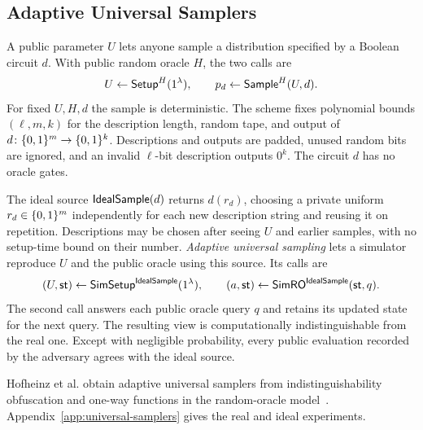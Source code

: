 \subsection{Adaptive Universal Samplers}
\label{sec:universal-samplers}
\label{sec:universal-sampler-syntax}

A public parameter $U$ lets anyone sample a distribution specified by a
Boolean circuit $d$.  With public random oracle $H$, the two calls are
\[
  U\mathrel{\leftarrow}\mathsf{Setup}^H(1^\lambda),
  \qquad p_d\gets\mathsf{Sample}^H(U,d).
\]
For fixed $U,H,d$ the sample is deterministic.  The scheme fixes polynomial
bounds $(\ell,m,k)$ for the description length, random tape, and output of
$d\colon\{0,1\}^m\to\{0,1\}^k$.  Descriptions and outputs are padded, unused
random bits are ignored, and an invalid $\ell$-bit description outputs
$0^k$.  The circuit $d$ has no oracle gates.

\label{sec:ideal-samples}
The ideal source $\mathsf{IdealSample}(d)$ returns $d(r_d)$, choosing a private
uniform $r_d\in\{0,1\}^m$ independently for each new description string and
reusing it on repetition.  Descriptions may be chosen after seeing $U$
and earlier samples, with no setup-time bound on their number.
\emph{Adaptive universal sampling} lets a simulator reproduce $U$ and
the public oracle using this source.  Its calls are
\[
  (U,\mathsf{st})\mathrel{\leftarrow}\mathsf{SimSetup}^{\mathsf{IdealSample}}(1^\lambda),
  \qquad (a,\mathsf{st})\mathrel{\leftarrow}\mathsf{SimRO}^{\mathsf{IdealSample}}(\mathsf{st},q).
\]
The second call answers each public oracle query $q$ and retains its updated
state for the next query. The resulting view is computationally
indistinguishable from the real one. Except with negligible probability,
every public evaluation recorded by the adversary agrees with the ideal source.

Hofheinz et al. obtain adaptive universal samplers from indistinguishability
obfuscation and one-way functions in the random-oracle model~\cite[full
version, Definition~4 and Theorem~3]{HofheinzEtAl2016UniversalSamplers}.
Appendix~\ref{app:universal-samplers} gives the real and ideal experiments.
